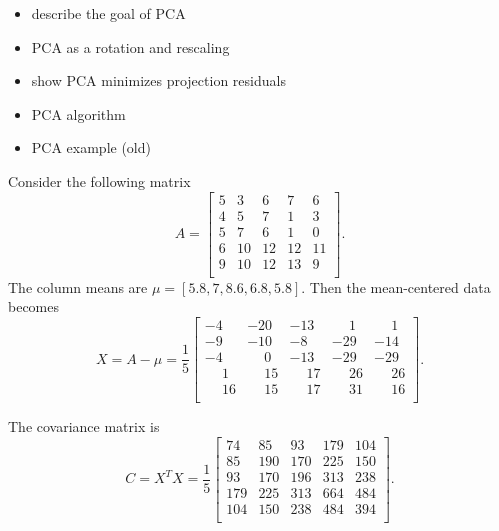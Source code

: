 \begin{itemize}
    \item describe the goal of PCA
    \item PCA as a rotation and rescaling
    \item show PCA minimizes projection residuals
    \item PCA algorithm
    \item PCA example (old)
\end{itemize}

\begin{example}
    \def\Amat{\begin{bmatrix}
        5 &  3 &  6 &  7 &  6 \\
        4 &  5 &  7 &  1 &  3 \\
        5 &  7 &  6 &  1 &  0 \\
        6 & 10 & 12 & 12 & 11 \\
        9 & 10 & 12 & 13 &  9 \\
    \end{bmatrix}}
    Consider the following matrix \[A = \Amat.\]
    The column means are \(\mu = [5.8,7,8.6,6.8,5.8]\).
    Then the mean-centered data becomes
    \def\-{\phantom{-}}
    \[X = A - \mu = \frac{1}{5}\begin{bmatrix}
            -4 &   -20 &   -13 &   \-1 &   \-1 \\
            -9 &   -10 &    -8 &   -29 &   -14 \\
            -4 &   \-0 &   -13 &   -29 &   -29 \\
            \-1 &  \-15 &  \-17 &  \-26 &  \-26 \\
        \-16 &  \-15 &  \-17 &  \-31 &  \-16 \\
    \end{bmatrix}.\]

    The covariance matrix is
    \[C = X^TX = \frac{1}{5}\begin{bmatrix}
            74 &  85 &  93 & 179 & 104 \\
            85 & 190 & 170 & 225 & 150 \\
            93 & 170 & 196 & 313 & 238 \\
        179 & 225 & 313 & 664 & 484 \\
        104 & 150 & 238 & 484 & 394 \\
    \end{bmatrix}.\]
    

\end{example}
